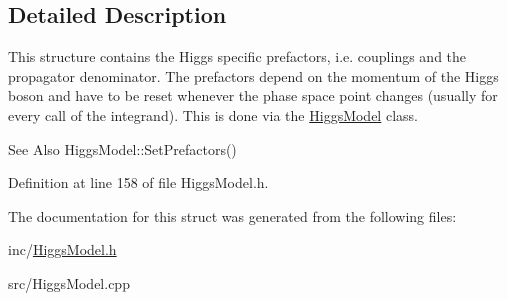 \subsection{Detailed Description}
This structure contains the Higgs specific prefactors, i.\-e. couplings and the propagator denominator. The prefactors depend on the momentum of the Higgs boson and have to be reset whenever the phase space point changes (usually for every call of the integrand). This is done via the \hyperlink{classHiggsModel}{Higgs\-Model} class. \begin{DoxySeeAlso}{See Also}
Higgs\-Model\-::\-Set\-Prefactors() 
\end{DoxySeeAlso}


Definition at line 158 of file Higgs\-Model.\-h.



The documentation for this struct was generated from the following files\-:\begin{DoxyCompactItemize}
\item 
inc/\hyperlink{HiggsModel_8h}{Higgs\-Model.\-h}\item 
src/Higgs\-Model.\-cpp\end{DoxyCompactItemize}
